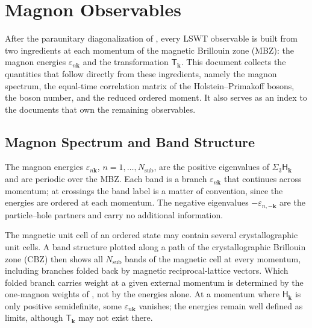 
\hypertarget{sec-lswt-magnon-observables}{%
\section{Magnon Observables}\label{sec-lswt-magnon-observables}}

After the paraunitary diagonalization of , every LSWT observable is built from two ingredients at each momentum of the magnetic Brillouin zone (MBZ): the magnon energies \(\varepsilon_{n\mathbf k}\) and the transformation \(\mathsf T_{\mathbf k}\). This document collects the quantities that follow directly from these ingredients, namely the magnon spectrum, the equal-time correlation matrix of the Holstein--Primakoff bosons, the boson number, and the reduced ordered moment. It also serves as an index to the documents that own the remaining observables.

\subsection{Magnon Spectrum and Band Structure}

The magnon energies \(\varepsilon_{n\mathbf k}\), \(n=1,\ldots,N_{\mathrm{sub}}\), are the positive eigenvalues of \(\Sigma_3\mathsf H_{\mathbf k}\) and are periodic over the MBZ. Each band is a branch \(\varepsilon_{n\mathbf k}\) that continues across momentum; at crossings the band label is a matter of convention, since the energies are ordered at each momentum. The negative eigenvalues \(-\varepsilon_{n,-\mathbf k}\) are the particle--hole partners and carry no additional information.

The magnetic unit cell of an ordered state may contain several crystallographic unit cells. A band structure plotted along a path of the crystallographic Brillouin zone (CBZ) then shows all \(N_{\mathrm{sub}}\) bands of the magnetic cell at every momentum, including branches folded back by magnetic reciprocal-lattice vectors. Which folded branch carries weight at a given external momentum is determined by the one-magnon weights of , not by the energies alone. At a momentum where \(\mathsf H_{\mathbf k}\) is only positive semidefinite, some \(\varepsilon_{n\mathbf k}\) vanishes; the energies remain well defined as limits, although \(\mathsf T_{\mathbf k}\) may not exist there.

